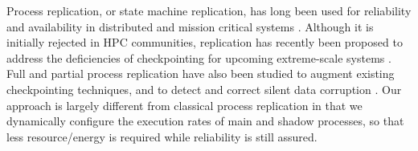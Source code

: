 Process replication, or state machine replication, has long been used for reliability and availability in distributed and mission critical systems \cite{schneider_1990_tutorial}. %
Although it is initially rejected in HPC communities, 
replication has recently been proposed to address the deficiencies of checkpointing for upcoming extreme-scale systems \cite{Cappello:09:Fault,engelmann2011redundant}. 
Full and partial
process replication have also been studied to augment existing checkpointing techniques, and to  
detect and correct silent data corruption \cite{stearly_2012_partial,elliott_2012_cpr,ferreira_sc_2011,fiala_2012_sdc}. %
Our approach is largely different from classical process replication in that we dynamically configure the execution rates of main and shadow processes, so that less resource/energy is required while reliability is still assured.  


